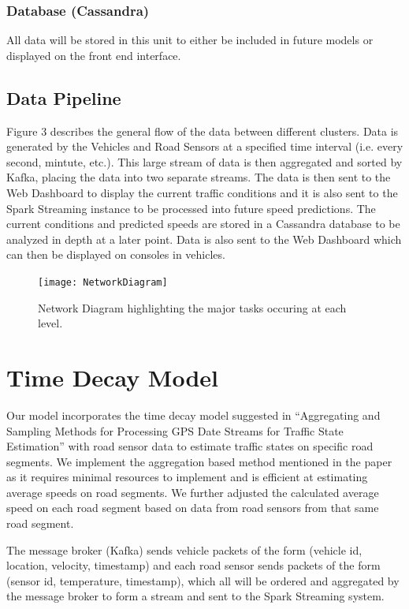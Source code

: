 \documentclass{vldb}
\begin{document}
\subsubsection{Database (Cassandra)}
All data will be stored in this unit to either be included in future models or displayed on the front end interface.

\subsection{Data Pipeline}
Figure 3 describes the general flow of the data between different clusters.  Data is generated by the Vehicles and Road Sensors at a specified time interval (i.e. every second, mintute, etc.). This large stream of data is then aggregated and sorted by Kafka, placing the data into two separate streams. The data is then sent to the Web Dashboard to display the current traffic conditions and it is also sent to the Spark Streaming instance to be processed into future speed predictions. The current conditions and predicted speeds are stored in a Cassandra database to be analyzed in depth at a later point. Data is also sent to the Web Dashboard which can then be displayed on consoles in vehicles. 


\begin{figure}
\centering
\texttt{[image: NetworkDiagram]}
\caption{Network Diagram highlighting the major tasks occuring at each level.}
\label{fig:networkdiagram}
\end{figure}


\section{Time Decay Model}
Our model incorporates the time decay model suggested in “Aggregating and Sampling Methods for Processing GPS Date Streams for Traffic State Estimation” with road sensor data to estimate traffic states on specific road segments. We implement the aggregation based method mentioned in the paper as it requires minimal resources to implement and is efficient at estimating average speeds on road segments. We further adjusted the calculated average speed on each road segment based on data from road sensors from that same road segment. 

The message broker (Kafka) sends vehicle packets of the form (vehicle id, location, velocity, timestamp) and each road sensor sends packets of the form (sensor id, temperature, timestamp), which all will be ordered and aggregated by the message broker to form a stream and sent to the Spark Streaming system. 
\end{document}
